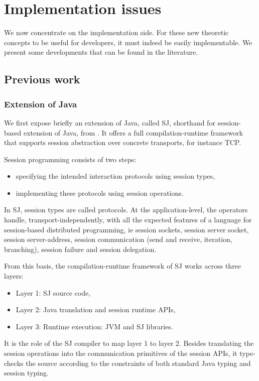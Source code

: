 \documentclass[a4paper,11pt,twoside]{report}
\begin{document}
\section{Implementation issues}
We now concentrate on the implementation side. For these new theoretic concepts to be useful for developers, it must indeed be easily implementable. We present some developments that can be found in the literature.

\subsection{Previous work}

\subsubsection{Extension of Java}
We first expose briefly an extension of Java, called SJ, shorthand for session-based extension of Java, from \cite{hu2008session}. It offers a full compilation-runtime framework that supports session abstraction over concrete transports, for instance TCP.

Session programming consists of two steps: 
\begin{itemize}
\item specifying the intended interaction protocols using session types, \item implementing these protocols using session operations.
\end{itemize}
In SJ, session types are called protocols. At the application-level, the operators handle, transport-independently, with all the expected features of a language for session-based distributed programming, ie session sockets, session server socket, session server-address, session communication (send and receive, iteration, branching), session failure and session delegation.

From this basis, the compilation-runtime framework of SJ works across three layers:
\begin{itemize}
\item Layer 1: SJ source code, \item Layer 2: Java translation and session runtime APIs, \item Layer 3: Runtime execution: JVM and SJ libraries.
\end{itemize}
It is the role of the SJ compiler to map layer 1 to layer 2. Besides translating the session operations into the communication primitives of the session APIs, it type-checks the source according to the constraints of both standard Java typing and session typing.
\end{document}
